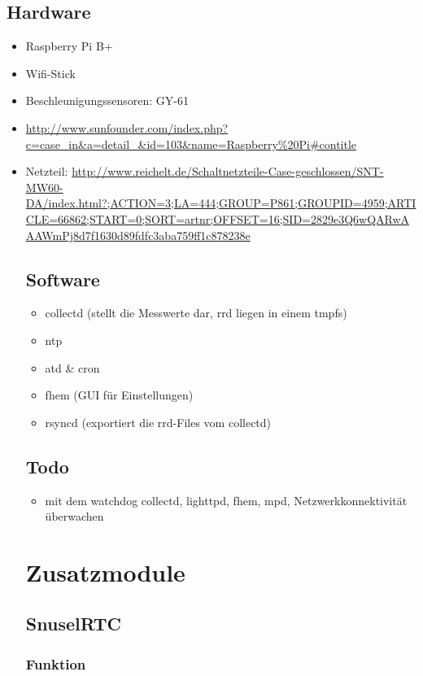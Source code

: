 \documentclass[a4paper,twoside,titlepage,normalheadings,tocleft,bibtotoc]{scrartcl}
\begin{document}
\subsection{Hardware}
\begin{itemize}
\item Raspberry Pi B+
\item Wifi-Stick
\item Beschleunigungssensoren:  GY-61
\item \url{http://www.sunfounder.com/index.php?c=case_in&a=detail_&id=103&name=Raspberry%20Pi#contitle}
\item Netzteil: \url{http://www.reichelt.de/Schaltnetzteile-Case-geschlossen/SNT-MW60-DA/index.html?;ACTION=3;LA=444;GROUP=P861;GROUPID=4959;ARTICLE=66862;START=0;SORT=artnr;OFFSET=16;SID=2829e3Q6wQARwAAAWmPj8d7f1630d89fdfc3aba759ff1c878238e}


\subsection{Software}
\begin{itemize}
\item collectd (stellt die Messwerte dar, rrd liegen in einem tmpfs)
\item ntp
\item atd & cron
\item fhem (GUI für Einstellungen)
\item rsyncd (exportiert die rrd-Files vom collectd)
\end{itemize}
\subsection{Todo}
\begin{itemize}
\item mit dem watchdog collectd, lighttpd, fhem, mpd, Netzwerkkonnektivität überwachen
\end{itemize}
\section{Zusatzmodule}
\subsection{SnuselRTC}
\subsubsection{Funktion}

\end{itemize}
\end{document}
